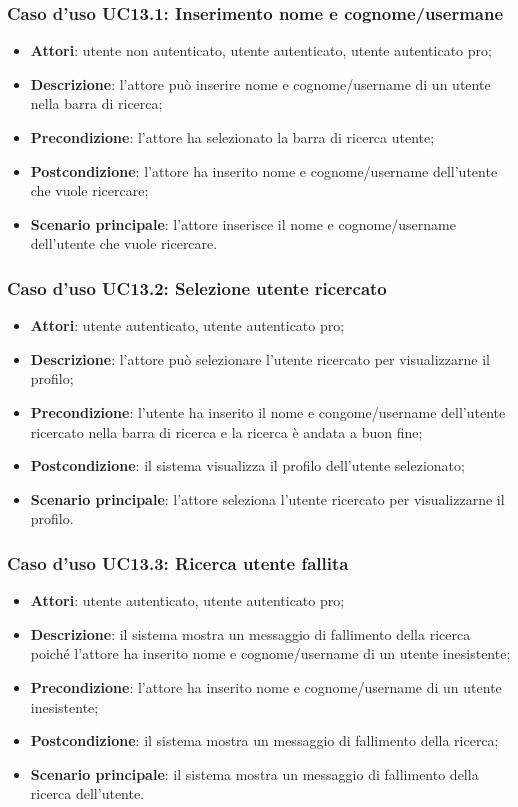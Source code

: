 \subsubsection{Caso d'uso UC13.1: Inserimento nome e cognome/usermane}

\begin{itemize}
	\item \textbf{Attori}: utente non autenticato, utente autenticato, utente autenticato pro;
	\item \textbf{Descrizione}: l'attore può inserire nome e cognome/username di un utente nella barra di ricerca;
	\item \textbf{Precondizione}: l'attore ha selezionato la barra di ricerca utente;
	\item \textbf{Postcondizione}: l'attore ha inserito nome e cognome/username dell'utente che vuole ricercare;
	\item \textbf{Scenario principale}: l'attore inserisce il nome e cognome/username dell'utente che vuole ricercare.
\end{itemize}

\subsubsection{Caso d'uso UC13.2: Selezione utente ricercato}

\begin{itemize}
	\item \textbf{Attori}: utente autenticato, utente autenticato pro;
	\item \textbf{Descrizione}: l'attore può selezionare l'utente ricercato per visualizzarne il profilo;
	\item \textbf{Precondizione}: l'utente ha inserito il nome e congome/username dell'utente ricercato nella barra di ricerca e la ricerca è andata a buon fine;
	\item \textbf{Postcondizione}: il sistema visualizza il profilo dell'utente selezionato;
	\item \textbf{Scenario principale}: l'attore seleziona l'utente ricercato per visualizzarne il profilo.
\end{itemize}

\subsubsection{Caso d'uso UC13.3: Ricerca utente fallita}

\begin{itemize}
	\item \textbf{Attori}: utente autenticato, utente autenticato pro;
	\item \textbf{Descrizione}: il sistema mostra un messaggio di fallimento della ricerca poiché l'attore ha inserito nome e cognome/username di un utente inesistente;
	\item \textbf{Precondizione}: l'attore ha inserito nome e cognome/username di un utente inesistente;
	\item \textbf{Postcondizione}: il sistema mostra un messaggio di fallimento della ricerca;
	\item \textbf{Scenario principale}: il sistema mostra un messaggio di fallimento della ricerca dell'utente.
\end{itemize}